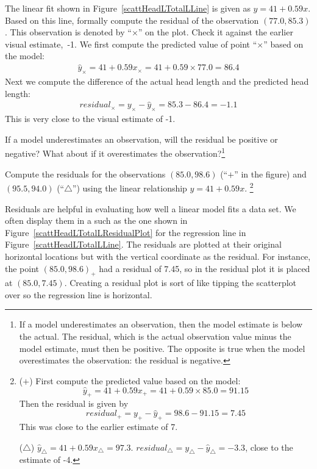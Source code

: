 \begin{example}{The linear fit shown in Figure~\ref{scattHeadLTotalLLine} is given as $\hat{y} = 41 + 0.59x$. Based on this line, formally compute the residual of the observation $(77.0, 85.3)$. This observation is denoted by ``$\times$'' on the plot. Check it against the earlier visual estimate,~-1.}
We first compute the predicted value of point ``$\times$'' based on the model:
\begin{eqnarray*}
\hat{y}_{\times} = 41+0.59x_{\times} = 41+0.59\times 77.0 = 86.4
\end{eqnarray*}
Next we compute the difference of the actual head length and the predicted head length:
\begin{eqnarray*}
residual_{\times} = y_{\times} - \hat{y}_{\times} = 85.3 -  86.4 = -1.1
\end{eqnarray*}
This is very close to the visual estimate of -1.
\end{example}

\begin{exercise}
If a model underestimates an observation, will the residual be positive or negative? What about if it overestimates the observation?\footnote{If a model underestimates an observation, then the model estimate is below the actual. The residual, which is the actual observation value minus the model estimate, must then be positive. The opposite is true when the model overestimates the observation: the residual is negative.}
\end{exercise}

\begin{exercise}
Compute the residuals for the observations $(85.0, 98.6)$ (``$+$'' in the figure) and $(95.5, 94.0)$ (``$\triangle$'') using the linear relationship $\hat{y} = 41 + 0.59x$. \footnote{($+$) First compute the predicted value based on the model: $$\hat{y}_{+} = 41+0.59x_{+} = 41+0.59\times 85.0 = 91.15$$ Then the residual is given by $$residual_{+} = y_{+} - \hat{y}_{+} = 98.6-91.15=7.45$$This was close to the earlier estimate of 7.

($\triangle$) $\hat{y}_{\triangle} = 41+0.59x_{\triangle} = 97.3$. $residual_{\triangle} = y_{\triangle} - \hat{y}_{\triangle} = -3.3$, close to the estimate of -4.}
\end{exercise}

Residuals are helpful in evaluating how well a linear model fits a data set. We often display them in a  such as the one shown in Figure~\ref{scattHeadLTotalLResidualPlot} for the regression line in Figure~\ref{scattHeadLTotalLLine}. The residuals are plotted at their original horizontal locations but with the vertical coordinate as the residual. For instance, the point $(85.0,98.6)_{+}$ had a residual of 7.45, so in the residual plot it is placed at $(85.0, 7.45)$. Creating a residual plot is sort of like tipping the scatterplot over so the regression line is horizontal. 

